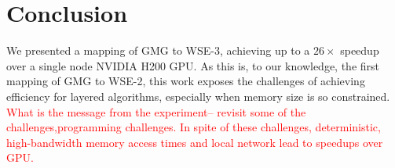 \documentclass[sigconf]{acmart}
\begin{document}
\section{Conclusion}
We presented a mapping of GMG to WSE-3, achieving up to a $26\times$ speedup over a single node NVIDIA H200 GPU.  As this is, to our knowledge, the first mapping of GMG to WSE-2, this work exposes the challenges of achieving efficiency for layered algorithms, especially when memory size is so constrained.   
\textcolor{red}{What is the message from the experiment-- revisit some of the challenges,programming challenges.  In spite of these challenges, deterministic, high-bandwidth memory access times and local network lead to speedups over GPU.}
\end{document}
